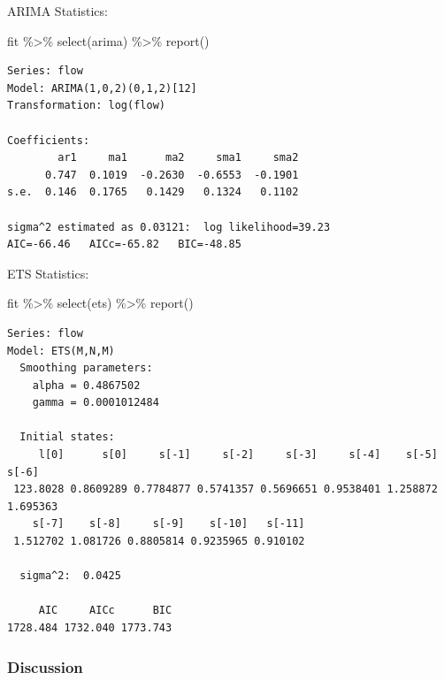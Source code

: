 \documentclass[
  letterpaper,
  DIV=11,
  numbers=noendperiod]{scrartcl}
\let\oldparagraph\paragraph
\renewcommand{\paragraph}[1]{\oldparagraph{#1}\mbox{}}
\newenvironment{Shaded}{\begin{snugshade}}{\end{snugshade}}
\newcommand{\FunctionTok}[1]{\textcolor[rgb]{0.28,0.35,0.67}{#1}}
\newcommand{\NormalTok}[1]{\textcolor[rgb]{0.00,0.23,0.31}{#1}}
\newcommand{\SpecialCharTok}[1]{\textcolor[rgb]{0.37,0.37,0.37}{#1}}
\begin{document}
ARIMA Statistics:

\begin{Shaded}
\begin{Highlighting}[]
\NormalTok{fit }\SpecialCharTok{\%\textgreater{}\%} 
  \FunctionTok{select}\NormalTok{(arima) }\SpecialCharTok{\%\textgreater{}\%} 
  \FunctionTok{report}\NormalTok{()}
\end{Highlighting}
\end{Shaded}

\begin{verbatim}
Series: flow 
Model: ARIMA(1,0,2)(0,1,2)[12] 
Transformation: log(flow) 

Coefficients:
        ar1     ma1      ma2     sma1     sma2
      0.747  0.1019  -0.2630  -0.6553  -0.1901
s.e.  0.146  0.1765   0.1429   0.1324   0.1102

sigma^2 estimated as 0.03121:  log likelihood=39.23
AIC=-66.46   AICc=-65.82   BIC=-48.85
\end{verbatim}

ETS Statistics:

\begin{Shaded}
\begin{Highlighting}[]
\NormalTok{fit }\SpecialCharTok{\%\textgreater{}\%} 
  \FunctionTok{select}\NormalTok{(ets) }\SpecialCharTok{\%\textgreater{}\%} 
  \FunctionTok{report}\NormalTok{()}
\end{Highlighting}
\end{Shaded}

\begin{verbatim}
Series: flow 
Model: ETS(M,N,M) 
  Smoothing parameters:
    alpha = 0.4867502 
    gamma = 0.0001012484 

  Initial states:
     l[0]      s[0]     s[-1]     s[-2]     s[-3]     s[-4]    s[-5]    s[-6]
 123.8028 0.8609289 0.7784877 0.5741357 0.5696651 0.9538401 1.258872 1.695363
    s[-7]    s[-8]     s[-9]    s[-10]   s[-11]
 1.512702 1.081726 0.8805814 0.9235965 0.910102

  sigma^2:  0.0425

     AIC     AICc      BIC 
1728.484 1732.040 1773.743 
\end{verbatim}

\hypertarget{section-3}{%
\paragraph{}\label{section-3}}

\hypertarget{discussion}{%
\subsubsection{Discussion}\label{discussion}}
\end{document}

